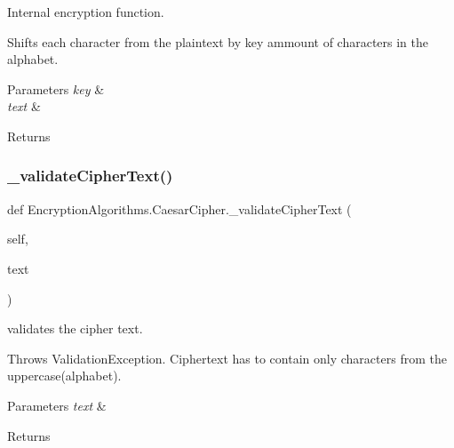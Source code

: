 Internal encryption function. 

Shifts each character from the plaintext by \textquotesingle{}key\textquotesingle{} ammount of characters in the alphabet.


\begin{DoxyParams}{Parameters}
{\em key} & \\
\hline
{\em text} & \\
\hline
\end{DoxyParams}
\begin{DoxyReturn}{Returns}

\end{DoxyReturn}
\mbox{\label{classEncryptionAlgorithms_1_1CaesarCipher_a55a7fb968fe4d734b8692271bba17c6b}} 
\subsubsection{\texorpdfstring{\+\_\+validate\+Cipher\+Text()}{\_validateCipherText()}}
{\footnotesize\ttfamily def Encryption\+Algorithms.\+Caesar\+Cipher.\+\_\+validate\+Cipher\+Text (\begin{DoxyParamCaption}\item[{}]{self,  }\item[{}]{text }\end{DoxyParamCaption})\hspace{0.3cm}{\ttfamily [private]}}



validates the cipher text. 

Throws Validation\+Exception. Ciphertext has to contain only characters from the uppercase(alphabet).


\begin{DoxyParams}{Parameters}
{\em text} & \\
\hline
\end{DoxyParams}
\begin{DoxyReturn}{Returns}

\end{DoxyReturn}
\mbox{\label{classEncryptionAlgorithms_1_1CaesarCipher_af790e8acc754ab66e19652aaf003ef45}} 
